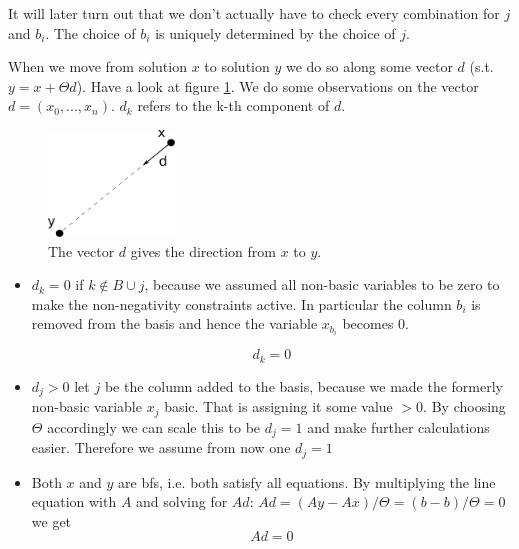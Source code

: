 It will later turn out that we don't actually have to check every combination for $j$ and $b_i$. The choice of $b_i$ is uniquely determined by the choice of $j$.

When we move from solution $x$ to solution $y$ we do so along some vector $d$ (s.t. $y=x+\Theta d$). Have a look at figure \ref{Fig:movingToSolutions}. We do some observations on the vector $d=(x_0,...,x_n)$. $d_k$ refers to the k-th component of $d$. 

\begin{figure}[hbt]
\begin{center}
\includegraphics[width=0.3\textwidth]{./images/movingToSolutions.pdf}
\end{center}
\caption{The vector $d$ gives the direction from $x$ to $y$.}
\label{Fig:movingToSolutions}
\end{figure}

\begin{itemize}
\item $d_k=0$ if $k\not \in B \cup j$, because we assumed all non-basic variables to be zero to make the non-negativity constraints active. In particular the column $b_i$ is removed from the basis and hence the variable $x_{b_i}$ becomes $0$.

\begin{equation} d_k=0 \label{equ:dkEquZero} \end{equation}

\item $d_j>0$ let $j$ be the column added to the basis, because we made the formerly non-basic variable $x_j$ basic. That is assigning it some value $>0$. By choosing $\Theta$ accordingly we can scale this to be $d_j=1$ and make further calculations easier. Therefore we assume from now one $d_j=1$

\item Both $x$ and $y$ are bfs, i.e. both satisfy all equations. By multiplying the line equation with $A$ and solving for $Ad$: $Ad = (Ay-Ax)/\Theta = (b-b)/\Theta = 0$ we get
\begin{equation} Ad = 0 \label{equ:AdEquZero}\end{equation}
\end{itemize}

